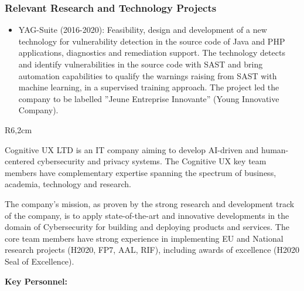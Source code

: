 \documentclass[a4paper,11pt]{article}
\begin{document}
\subsubsection*{Relevant Research and Technology Projects}

\begin{itemize}
\item YAG-Suite (2016-2020): Feasibility, design and development of a new technology for vulnerability detection in the source code of Java and PHP applications, diagnostics and remediation support. The technology detects and identify vulnerabilities in the source code with SAST and bring automation capabilities to qualify the warnings raising from SAST with machine learning, in a supervised training approach. The project led the company to be labelled ”Jeune Entreprise Innovante” (Young Innovative Company).
\end{itemize}





\begin{wrapfigure}{R}{6,2cm}
\vspace{-3cm}
\hfill {}
\vspace{-1cm}
\end{wrapfigure}
\vspace{10pt}

Cognitive UX LTD is an IT company aiming to develop AI-driven and human-centered cybersecurity and privacy systems. The Cognitive UX key team members have complementary expertise spanning the spectrum of business, academia, technology and research. 

The company’s mission, as proven by the strong research and development track of the company, is to apply state-of-the-art and innovative developments in the domain of Cybersecurity for building and deploying products and services. The core team members have strong experience in implementing EU and National research projects (H2020, FP7, AAL, RIF), including awards of excellence (H2020 Seal of Excellence).

\vspace{10pt}

\textbf{Key Personnel:}
\end{document}
